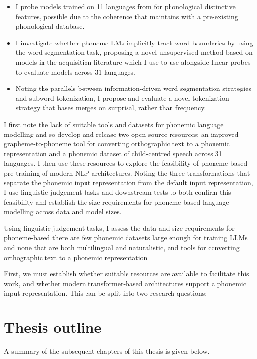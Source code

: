 \begin{itemize}
    \item I probe models trained on 11 languages from \ipachildes for phonological distinctive features, possible due to the coherence that \gpp maintains with a pre-existing phonological database. 
    \item I investigate whether phoneme LMs implicitly track word boundaries by using the word segmentation task, proposing a novel unsupervised method based on models in the acquisition literature which I use to use alongside linear probes to evaluate models across 31 languages.
    \item Noting the parallels between information-driven word segmentation strategies and subword tokenization, I propose and evaluate a novel tokenization strategy that bases merges on surprisal, rather than frequency.
\end{itemize}

I first note the lack of suitable tools and datasets for phonemic language modelling and so develop and release two open-source resources; an improved grapheme-to-phoneme tool for converting orthographic text to a phonemic representation and a phonemic dataset of child-centred speech across 31 languages. I then use these resources to explore the feasibility of phoneme-based pre-training of modern NLP architectures. Noting the three transformations that separate the phonemic input representation from the default input representation, I use linguistic judgement tasks and downstream tests to both confirm this feasibility and establish the size requirements for phoneme-based language modelling across data and model sizes. 

Using linguistic judgement tasks, I assess the data and size requirements for phoneme-based there are few phonemic datasets large enough for training LLMs and none that are both multilingual and naturalistic, and tools for converting orthographic text to a phonemic representation 


First, we must establish whether suitable resources are available to facilitate this work, and whether modern transformer-based architectures support a phonemic input representation. This can be split into two research questions:

\section{Thesis outline}

A summary of the subsequent chapters of this thesis is given below.

